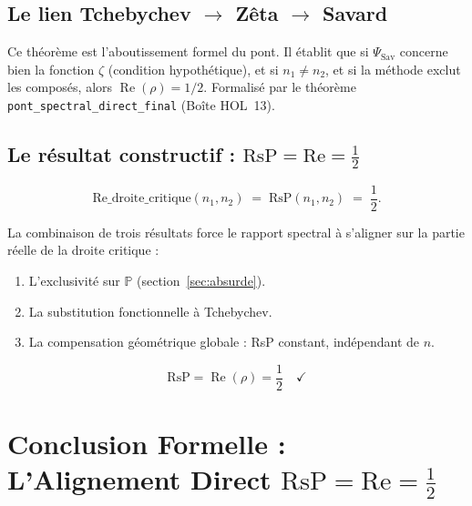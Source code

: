 \documentclass[]{pasj02}
\begin{document}
\subsection{Le lien Tchebychev $\to$ Zêta $\to$ Savard}
\label{ssec:lien}
\label{hol:pont_savard_tchebychev_zeta}

Ce théorème est l'aboutissement formel du pont.  Il établit que si
$\Psi_{\mathrm{Sav}}$ concerne bien la fonction $\zeta$ (condition
hypothétique), et si $n_1 \neq n_2$, et si la méthode exclut les composés,
alors $\operatorname{Re}(\rho) = 1/2$.  Formalisé par le théorème
\texttt{pont\_spectral\_direct\_final} (Boîte HOL~13).

\subsection{Le résultat constructif : $\mathrm{RsP} = \mathrm{Re} =
\tfrac{1}{2}$}
\label{ssec:resultat}
\label{hol:re_droite_critique}

\begin{definition}
  \begin{equation}
    \mathrm{Re\_droite\_critique}(n_1,n_2) \;=\; \mathrm{RsP}(n_1,n_2)
    \;=\; \frac{1}{2}.
  \end{equation}
\end{definition}

La combinaison de trois résultats force le rapport spectral à s'aligner sur
la partie réelle de la droite critique :
\begin{enumerate}
  \item L'exclusivité sur $\mathbb{P}$ (section~\ref{sec:absurde}).
  \item La substitution fonctionnelle à Tchebychev.
  \item La compensation géométrique globale : RsP constant, indépendant de $n$.
\end{enumerate}

\begin{equation}
  \mathrm{RsP} = \operatorname{Re}(\rho) = \frac{1}{2}
  \quad\checkmark
\end{equation}

\section{Conclusion Formelle : L'Alignement Direct
$\mathrm{RsP} = \mathrm{Re} = \tfrac{1}{2}$}
\label{sec:alignement}
\end{document}
